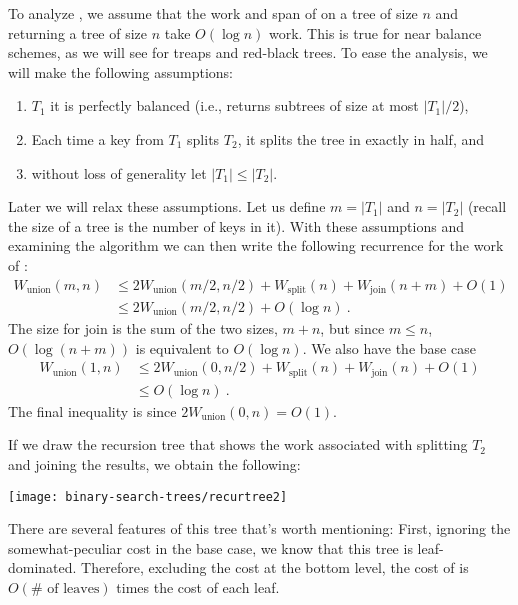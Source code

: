 To analyze , we assume that the work and span of
\csplit{} on a tree of size $n$ and \cjoin{} returning a tree of size
$n$ take $O(\log n)$ work.  This is true for near balance schemes, as
we will see for treaps and red-black trees.
To ease the analysis, we will make the following assumptions:
\begin{enumerate}
\item $T_1$ it is perfectly balanced (i.e., \cexpose{} returns subtrees of
  size at most $|T_1|/2$), 
\item Each time a key from $T_1$ splits $T_2$, it splits the tree in
  exactly in half, and
\item without loss of generality let $|T_1| \leq |T_2|$.
\end{enumerate}
Later we will relax these assumptions.  Let us define $m = |T_1|$ and
$n = |T_2|$ (recall the size of a tree is the number of keys in it).
With these assumptions and examining the algorithm we can then write
the following recurrence for the work of :
\begin{align*}
  W_{\mbox{union}}(m, n) &\leq 2W_{\mbox{union}}(m/2,n/2) + W_{\mbox{split}}(n)
+ W_{\mbox{join}}(n+m) + O(1)\\
   & \leq  2W_{\mbox{union}}(m/2, n/2) + O(\log n)~.
\end{align*}  
The size for join is the sum of the two sizes, $m+n$, but since 
$m \leq n$, $O(\log (n + m))$ is equivalent to $O(\log n)$.
We also have the base case
\begin{align*}
  W_{\mbox{union}}(1, n) & \leq 2W_{\mbox{union}}(0,n/2) + W_{\mbox{split}}(n)
+ W_{\mbox{join}}(n) + O(1)\\
         & \leq O(\log n)~.
\end{align*}
The final inequality is since $2W_{\mbox{union}}(0,n) = O(1)$.

If we draw the recursion tree that shows the work associated with
splitting $T_2$ and joining the results, we obtain the following:


\begin{center}
  \texttt{[image: binary-search-trees/recurtree2]}
\end{center}
%
There are several features of this tree that's worth mentioning:
First, ignoring the somewhat-peculiar cost in the base case, we know
that this tree is leaf-dominated.  Therefore, excluding the cost at
the bottom level, the cost of \cunion{} is $O(\#\text{ of leaves})$
times the cost of each leaf.

